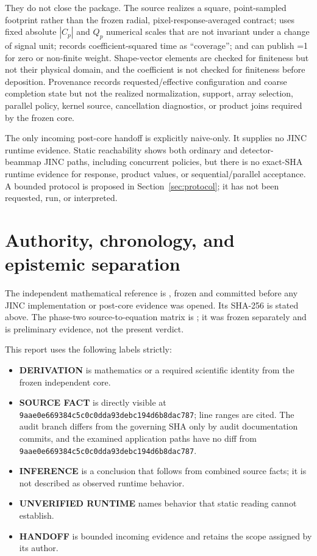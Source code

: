\documentclass[10pt]{article}
\newcommand{\appsha}{9aae0e669384c5c0c0dda93debc194d6b8dac787}
\newcommand{\corelabel}{\textbf{DERIVATION}}
\newcommand{\srclabel}{\textbf{SOURCE FACT}}
\newcommand{\inflabel}{\textbf{INFERENCE}}
\newcommand{\runlabel}{\textbf{UNVERIFIED RUNTIME}}
\newcommand{\handofflabel}{\textbf{HANDOFF}}
\begin{document}
They do not close the package.  The source realizes a square, point-sampled
footprint rather than the frozen radial, pixel-response-averaged contract;
uses fixed absolute $|C_p|$ and $Q_p$ numerical scales that are not invariant
under a change of signal unit; records coefficient-squared time as
``coverage''; and can publish =1 for zero or non-finite
weight.  Shape-vector elements are checked for finiteness but not their
physical domain, and the coefficient is not checked for finiteness before
deposition.  Provenance records requested/effective configuration and coarse
completion state but not the realized normalization, support, array
selection, parallel policy, kernel source, cancellation diagnostics, or
product joins required by the frozen core.

The only incoming post-core handoff is explicitly naive-only.  It supplies no
JINC runtime evidence.  Static reachability shows both ordinary and detector-
beammap JINC paths, including concurrent policies, but there is no exact-SHA
runtime evidence for response, product values, or sequential/parallel
acceptance.  A bounded protocol is proposed in Section~\ref{sec:protocol}; it
has not been requested, run, or interpreted.

\section{Authority, chronology, and epistemic separation}

The independent mathematical reference is
, frozen and
committed before any JINC implementation or post-core evidence was opened.
Its SHA-256 is stated above.  The phase-two source-to-equation matrix is
; it was frozen
separately and is preliminary evidence, not the present verdict.

This report uses the following labels strictly:

\begin{itemize}[leftmargin=*]
  \item \corelabel{} is mathematics or a required scientific identity from
        the frozen independent core.
  \item \srclabel{} is directly visible at \texttt{\appsha}; line ranges are
        cited.  The audit branch differs from the governing SHA only by audit
        documentation commits, and the examined application paths have no
        diff from \texttt{\appsha}.
  \item \inflabel{} is a conclusion that follows from combined source facts;
        it is not described as observed runtime behavior.
  \item \runlabel{} names behavior that static reading cannot establish.
  \item \handofflabel{} is bounded incoming evidence and retains the scope
        assigned by its author.
\end{itemize}
\end{document}
